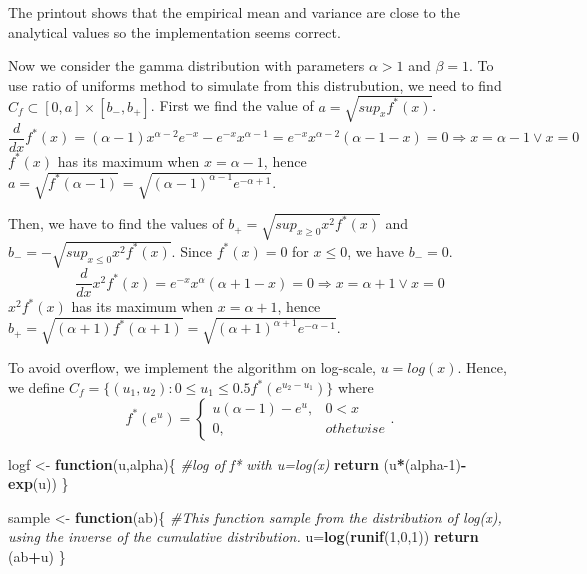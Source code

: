 \documentclass[]{article}
\newenvironment{Shaded}{\begin{snugshade}}{\end{snugshade}}
\newcommand{\CommentTok}[1]{\textcolor[rgb]{0.56,0.35,0.01}{\textit{#1}}}
\newcommand{\ControlFlowTok}[1]{\textcolor[rgb]{0.13,0.29,0.53}{\textbf{#1}}}
\newcommand{\DecValTok}[1]{\textcolor[rgb]{0.00,0.00,0.81}{#1}}
\newcommand{\KeywordTok}[1]{\textcolor[rgb]{0.13,0.29,0.53}{\textbf{#1}}}
\newcommand{\NormalTok}[1]{#1}
\newcommand{\OperatorTok}[1]{\textcolor[rgb]{0.81,0.36,0.00}{\textbf{#1}}}
\newcommand{\StringTok}[1]{\textcolor[rgb]{0.31,0.60,0.02}{#1}}
\begin{document}
The printout shows that the empirical mean and variance are close to the
analytical values so the implementation seems correct.

Now we consider the gamma distribution with parameters \(\alpha>1\) and
\(\beta=1\). To use ratio of uniforms method to simulate from this
distrubution, we need to find \(C_f\subset[0,a] \times [b_-,b_+]\).
First we find the value of \(a=\sqrt{sup_xf^*(x)}\). \[
\frac{d}{dx}f^*(x)=(\alpha-1)x^{\alpha-2}e^{-x}-e^{-x}x^{\alpha-1}=e^{-x}x^{\alpha-2}(\alpha-1-x)=0 \Rightarrow x=\alpha-1  \lor x=0
\] \(f^*(x)\) has its maximum when \(x=\alpha-1\), hence
\(a=\sqrt{f^*(\alpha-1)}=\sqrt{(\alpha-1)^{\alpha-1}e^{-\alpha+1}}\).

Then, we have to find the values of \(b_+=\sqrt{sup_{x\geq0}x^2f^*(x)}\)
and \(b_-=-\sqrt{sup_{x\leq0}x^2f^*(x)}\). Since \(f^*(x)=0\) for
\(x\leq0\), we have \(b_-=0\). \[
\frac{d}{dx}x^2f^*(x)=e^{-x}x^{\alpha}(\alpha+1-x)=0 \Rightarrow x=\alpha+1     \lor x=0
\] \(x^2f^*(x)\) has its maximum when \(x=\alpha+1\), hence
\(b_+=\sqrt{(\alpha+1)f^*(\alpha+1)}=\sqrt{(\alpha+1)^{\alpha+1}e^{-\alpha-1}}\).

To avoid overflow, we implement the algorithm on log-scale,
\(u=log(x)\). Hence, we define
\(C_f=\{ (u_1,u_2):0\leq u_1 \leq 0.5{f^*(e^{u_2-u_1})}\}\) where \[
f^*(e^u)=\begin{cases} u(\alpha-1)-e^u, & 0<x \\ 0, & othetwise \end{cases}.
\]

\begin{Shaded}
\begin{Highlighting}[]
\NormalTok{logf <-}\StringTok{ }\ControlFlowTok{function}\NormalTok{(u,alpha)\{ }\CommentTok{#log of f* with u=log(x)}
  \KeywordTok{return}\NormalTok{ (u}\OperatorTok{*}\NormalTok{(alpha}\DecValTok{-1}\NormalTok{)}\OperatorTok{-}\KeywordTok{exp}\NormalTok{(u))}
\NormalTok{\}}

\NormalTok{sample <-}\StringTok{ }\ControlFlowTok{function}\NormalTok{(ab)\{ }\CommentTok{#This function sample from the distribution of log(x), using the inverse of the cumulative distribution. }
\NormalTok{  u=}\KeywordTok{log}\NormalTok{(}\KeywordTok{runif}\NormalTok{(}\DecValTok{1}\NormalTok{,}\DecValTok{0}\NormalTok{,}\DecValTok{1}\NormalTok{))}
  \KeywordTok{return}\NormalTok{ (ab}\OperatorTok{+}\NormalTok{u)}
\NormalTok{\}}
\end{Highlighting}
\end{Shaded}
\end{document}
